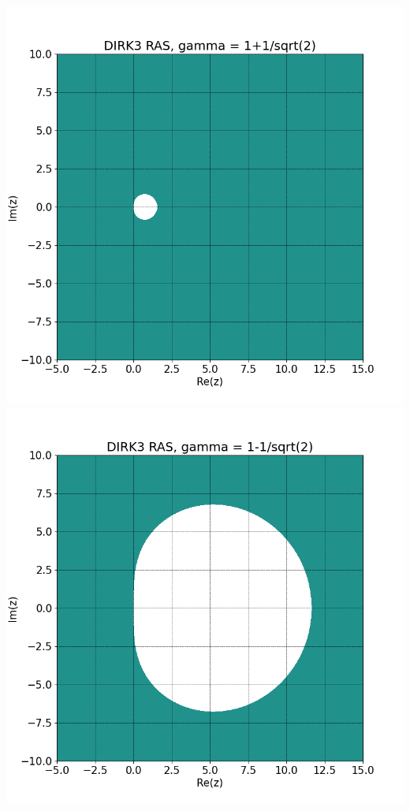 \documentclass{article}
\begin{document}
\begin{enumerate}
\begin{center}
\includegraphics[scale=.3]{hw3 dirk3 ras 1}
\includegraphics[scale=.3]{hw3 dirk3 ras 2}
\end{center}
	
\end{enumerate}
\end{document}

